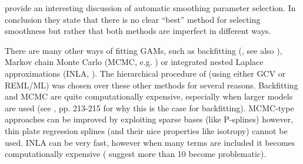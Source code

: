 
 provide an interesting discussion of automatic smoothing parameter selection. In conclusion they state that there is no clear ``best'' method for selecting smoothness but rather that both methods are imperfect in different ways. 




There are many other ways of fitting GAMs, such as backfitting (, see also ), Markov chain Monte Carlo (MCMC, e.g. ) or integrated nested Laplace approximations (INLA, ). The hierarchical procedure of  (using either GCV or REML/ML) was chosen over these other methods for several reasons. Backfitting and MCMC are quite computationally expensive, especially when larger models are used (see , pp. 213-215 for why this is the case for backfitting). MCMC-type approaches can be improved by exploiting sparse bases (like P-splines) however, thin plate regression splines (and their nice properties like isotropy) cannot be used. INLA can be very fast, however when many terms are included it becomes computationally expensive ( suggest more than 10 become problematic).

